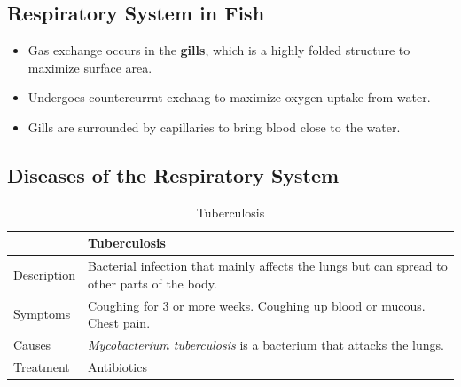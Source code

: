 \documentclass[12pt]{report}
\begin{document}
\subsection{Respiratory System in Fish}
\begin{definition}
    \invis
    \begin{itemize}
        \item{Gas exchange occurs in the \textbf{gills}, which is a highly folded structure to maximize surface area.}
        \item{Undergoes countercurrnt exchang to maximize oxygen uptake from water.}
        \item{Gills are surrounded by capillaries to bring blood close to the water.}
    \end{itemize}
\end{definition}

\subsection{Diseases of the Respiratory System}
\begin{table}[h!]
    \renewcommand{\arraystretch}{1.5}
    \setlength{\tabcolsep}{10pt}
    \setlength{\arrayrulewidth}{0.25mm}

    \begin{center}
        \vspace{0.5em}
        \begin{tabular}{|l|p{}|}
        \hline
         & Tuberculosis \\ 
        \hline
        Description & Bacterial infection that mainly affects the lungs but can spread to other parts of the body. \\
        \hline
        Symptoms & Coughing for 3 or more weeks. Coughing up blood or mucous. Chest pain.\\ 
        \hline 
        Causes & \textit{Mycobacterium tuberculosis} is a bacterium that attacks the lungs.\\ 
        \hline 
        Treatment & Antibiotics\\ 
        \hline
        \end{tabular}
    \end{center}
    \caption{Tuberculosis}
\end{table}
\end{document}
